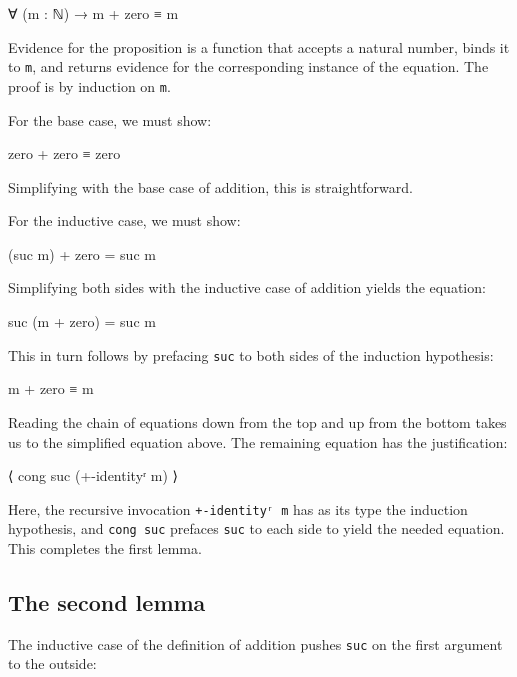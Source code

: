 \begin{myDisplay}
∀ (m : ℕ) → m + zero ≡ m
\end{myDisplay}

Evidence for the proposition is a function that accepts a natural
number, binds it to \texttt{m}, and returns evidence for the
corresponding instance of the equation. The proof is by induction on
\texttt{m}.

For the base case, we must show:

\begin{myDisplay}
zero + zero ≡ zero
\end{myDisplay}

Simplifying with the base case of addition, this is straightforward.

For the inductive case, we must show:

\begin{myDisplay}
(suc m) + zero = suc m
\end{myDisplay}

Simplifying both sides with the inductive case of addition yields the
equation:

\begin{myDisplay}
suc (m + zero) = suc m
\end{myDisplay}

This in turn follows by prefacing \texttt{suc} to both sides of the
induction hypothesis:

\begin{myDisplay}
m + zero ≡ m
\end{myDisplay}

Reading the chain of equations down from the top and up from the bottom
takes us to the simplified equation above. The remaining equation has
the justification:

\begin{myDisplay}
⟨ cong suc (+-identityʳ m) ⟩
\end{myDisplay}

Here, the recursive invocation \texttt{+-identityʳ\ m} has as its type
the induction hypothesis, and \texttt{cong\ suc} prefaces \texttt{suc}
to each side to yield the needed equation. This completes the first
lemma.

\hypertarget{the-second-lemma}{%
\subsection{The second lemma}\label{the-second-lemma}}

The inductive case of the definition of addition pushes \texttt{suc} on
the first argument to the outside:

